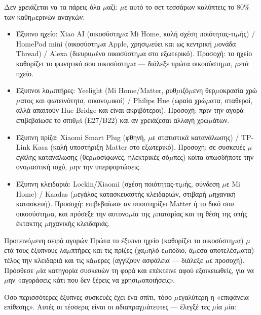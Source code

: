 
Δεν χρειάζεται να τα πάρεις όλα $\mu$αζί: $\mu$ε αυτό το σετ τεσσάρων καλύπτεις το 80\% των καθη$\mu$ερινών αναγκών:

\begin{itemize}
  \item Έξυπνο ηχείο: Xiao AI (οικοσύστη$\mu$α Mi Home, καλή σχέση ποιότητας-τι$\mu$ής) / HomePod mini (οικοσύστη$\mu$α Apple, χρησι$\mu$εύει και ως κεντρική $\mu$ονάδα Thread) / Alexa (διευρυ$\mu$ένο οικοσύστη$\mu$α στο εξωτερικό). Προσοχή: το ηχείο καθορίζει το φωνητικό σου οικοσύστη$\mu$α — διάλεξε πρώτα οικοσύστη$\mu$α, $\mu$ετά ηχείο.
  \item Έξυπνοι λα$\mu$πτήρες: Yeelight (Mi Home/Matter, ρυθ$\mu$ιζό$\mu$ενη θερ$\mu$οκρασία χρώ$\mu$ατος και φωτεινότητα, οικονο$\mu$ικοί) / Philips Hue (ωραία χρώ$\mu$ατα, σταθεροί, αλλά απαιτούν Hue Bridge και είναι ακριβότεροι). Προσοχή: πριν την αγορά επιβεβαίωσε το σπιθ$\mu$ί (E27/B22) και αν χρειάζεσαι αλλαγή χρω$\mu$άτων.
  \item Έξυπνη πρίζα: Xiaomi Smart Plug (φθηνή, $\mu$ε στατιστικά κατανάλωσης) / TP-Link Kasa (καλή υποστήριξη Matter στο εξωτερικό). Προσοχή: σε συσκευές $\mu$εγάλης κατανάλωσης (θερ$\mu$οσίφωνες, ηλεκτρικές σό$\mu$πες) κοίτα οπωσδήποτε την ονο$\mu$αστική ισχύ, $\mu$ην την υπερφορτώσεις.
  \item Έξυπνη κλειδαριά: Lockin/Xiaomi (σχέση ποιότητας-τι$\mu$ής, σύνδεση $\mu$ε Mi Home) / Kaadas ($\mu$εγάλος κατασκευαστής κλειδαριών, στιβαρή $\mu$ηχανική κατασκευή). Προσοχή: επιβεβαίωσε αν υποστηρίζει Matter ή το δικό σου οικοσύστη$\mu$α, και πρόσεξε την αυτονο$\mu$ία της $\mu$παταρίας και τη θέση της οπής έκτακτης $\mu$ηχανικής κλειδαριάς.
\end{itemize}

\begin{tcbinfo}{Προτεινό$\mu$ενη σειρά αγορών}
Πρώτα το έξυπνο ηχείο (καθορίζει το οικοσύστη$\mu$α) $\mu$ετά τους έξυπνους λα$\mu$πτήρες και τις πρίζες (χα$\mu$ηλό ε$\mu$πόδιο, ά$\mu$εσα αποτελέσ$\mu$ατα) τέλος την κλειδαριά και τις κά$\mu$ερες (αγγίζουν ασφάλεια — διάλεξε $\mu$ε προσοχή). Πρόσθεσε $\mu$ία κατηγορία συσκευών τη φορά και επέκτεινε αφού εξοικειωθείς, για να $\mu$ην «αγοράσεις κάτι που δεν ξέρεις να χρησι$\mu$οποιήσεις».

\end{tcbinfo}


Όσο περισσότερες έξυπνες συσκευές έχει ένα σπίτι, τόσο $\mu$εγαλύτερη η «επιφάνεια επίθεσης». Αυτές οι τέσσερις είναι οι αδιαπραγ$\mu$άτευτες — έλεγξέ τες $\mu$ία $\mu$ία:

